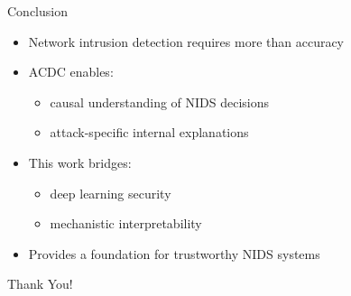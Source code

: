 \documentclass{beamer}
\begin{document}
	
	\begin{frame}{Conclusion}
		\begin{itemize}
			\item Network intrusion detection requires more than accuracy
			\item ACDC enables:
			\begin{itemize}
				\item causal understanding of NIDS decisions
				\item attack-specific internal explanations
			\end{itemize}
			\item This work bridges:
			\begin{itemize}
				\item deep learning security
				\item mechanistic interpretability
			\end{itemize}
			\item Provides a foundation for trustworthy NIDS systems
		\end{itemize}
	\end{frame}	
	
	\begin{frame}
		\centering
		\Large{Thank You!}
	\end{frame}
	
\end{document}
